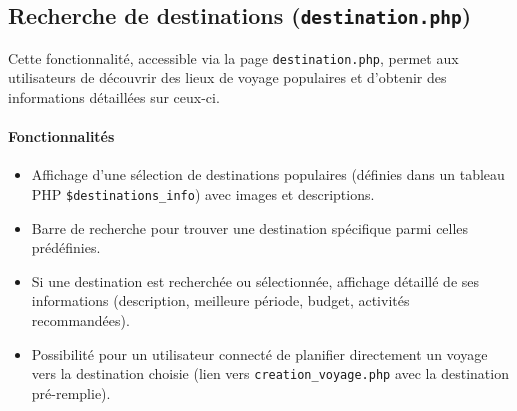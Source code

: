 \documentclass[a4paper,12pt]{article}
\begin{document}
\subsection{Recherche de destinations (\texttt{destination.php})}

Cette fonctionnalité, accessible via la page \texttt{destination.php}, permet aux utilisateurs de découvrir des lieux de voyage populaires et d’obtenir des informations détaillées sur ceux-ci.

\paragraph{Fonctionnalités}
\begin{itemize}
  \item Affichage d'une sélection de destinations populaires (définies dans un tableau PHP \texttt{\$destinations\_info}) avec images et descriptions.
  \item Barre de recherche pour trouver une destination spécifique parmi celles prédéfinies.
  \item Si une destination est recherchée ou sélectionnée, affichage détaillé de ses informations (description, meilleure période, budget, activités recommandées).
  \item Possibilité pour un utilisateur connecté de planifier directement un voyage vers la destination choisie (lien vers \texttt{creation\_voyage.php} avec la destination pré-remplie).
\end{itemize}
\end{document}
